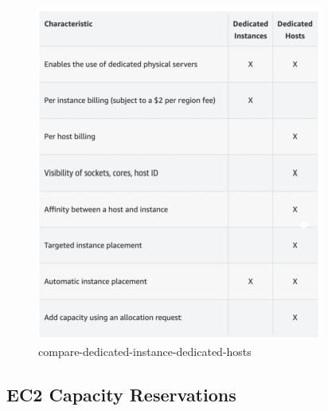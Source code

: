 \begin{figure}[htbp]
	\centering
	\includegraphics[width=1\linewidth]{images/compare-dedicated-instance-dedicated-hosts.png}
	\caption{compare-dedicated-instance-dedicated-hosts}
	\label{fig:compare-dedicated-instance-dedicated-hosts}
\end{figure}


\subsection{EC2 Capacity Reservations}

